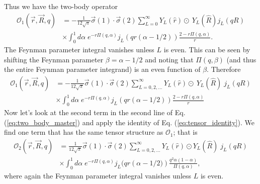 \documentclass[12pt,letterpaper]{book}
\begin{document}
Thus we have the two-body operator
\begin{equation}
\begin{split}
\mathcal{O}_1(\vec{r},\vec{R},q)&=-\frac{1}{12\sqrt{\pi}}\vec{\sigma}(1)\cdot\vec{\sigma}(2)\sum_{L=0}^{\infty}Y_L(\hat{r})\odot\ Y_L(\hat{R})j_L(q R)\\
&\times\int_0^1d\alpha\;e^{-r\Pi(q,\alpha)}j_L\left(q r(\alpha-1/2)\right)\frac{2-r\Pi(q,\alpha)}{r}.
\end{split}
\end{equation}
The Feynman parameter integral vanishes unless $L$ is even. This can be seen by shifting the Feynman parameter $\beta=\alpha-1/2$ and noting that $\Pi(q,\beta)$ (and thus the entire Feynman parameter integrand) is an even function of $\beta$. Therefore
\begin{equation}
\begin{split}
\mathcal{O}_1(\vec{r},\vec{R},q)&=-\frac{1}{12\sqrt{\pi}}\vec{\sigma}(1)\cdot\vec{\sigma}(2)\sum_{L=0,2,...}^{\infty}Y_L(\hat{r})\odot\ Y_L(\hat{R})\;j_L(q R)\\
&\times\int_0^1d\alpha\;e^{-r\Pi(q,\alpha)}j_L\left(q r(\alpha-1/2)\right)\frac{2-r\Pi(q,\alpha)}{r}
\end{split}
\end{equation}
Now let's look at the second term in the second line of Eq. (\ref{eq:two_body_master}) and apply the identity of Eq. (\ref{eq:tensor_identity}). We find one term that has the same tensor structure as $\mathcal{O}_1$; that is
\begin{equation}
\begin{split}
\mathcal{O}_2(\vec{r},\vec{R},q)&=\frac{1}{12\sqrt{\pi}}\vec{\sigma}(1)\cdot\vec{\sigma}(2)\sum_{L=0,2,...}^{\infty}Y_L(\hat{r})\odot Y_L(\hat{R})\;j_L(q R)\\
&\times\int_0^1 d\alpha\;e^{-r\Pi(q,\alpha)}j_L(q r\left(\alpha-1/2)\right)\frac{q^2\alpha(1-\alpha)}{\Pi(q,\alpha)},
\end{split}
\end{equation}
where again the Feynman parameter integral vanishes unless $L$ is even. 
\end{document}
